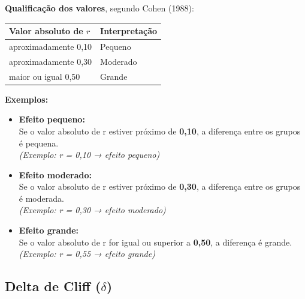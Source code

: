 \documentclass[
]{book}
\begin{document}
\textbf{Qualificação dos valores}, segundo Cohen (1988):

\begin{longtable}[]{@{}ll@{}}
\toprule\noalign{}
Valor absoluto de \(r\) & Interpretação \\
\midrule\noalign{}
\endhead
\bottomrule\noalign{}
\endlastfoot
aproximadamente 0,10 & Pequeno \\
aproximadamente 0,30 & Moderado \\
maior ou igual 0,50 & Grande \\
\end{longtable}

\textbf{Exemplos:}

\begin{itemize}
\item
  \textbf{Efeito pequeno:}\\
  Se o valor absoluto de r estiver próximo de \textbf{0,10}, a diferença entre os grupos é pequena.\\
  \emph{(Exemplo: \textbar r\textbar{} = 0,10 → efeito pequeno)}
\item
  \textbf{Efeito moderado:}\\
  Se o valor absoluto de r estiver próximo de \textbf{0,30}, a diferença entre os grupos é moderada.\\
  \emph{(Exemplo: \textbar r\textbar{} = 0,30 → efeito moderado)}
\item
  \textbf{Efeito grande:}\\
  Se o valor absoluto de r for igual ou superior a \textbf{0,50}, a diferença é grande.\\
  \emph{(Exemplo: \textbar r\textbar{} = 0,55 → efeito grande)}
\end{itemize}

\subsection{\texorpdfstring{Delta de Cliff (\(\delta\))}{Delta de Cliff (\textbackslash delta)}}\label{delta-de-cliff-delta}
\end{document}
